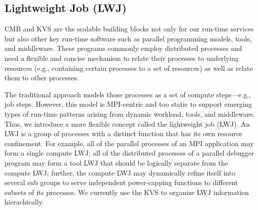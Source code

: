 \subsection{Lightweight Job (LWJ)}
CMB and KVS are the scalable building blocks not only for our run-time services 
but also other key run-time software such as parallel programming models, 
tools, and middleware. These programs commonly employ distributed processes and need a 
flexible and concise mechanism to relate their processes to underlying resources 
(e.g., containing certain processes to a set of resources) as well as relate 
them to other processes. 

The traditional approach models those processes as
a set of compute steps---e.g., job steps. However, this model 
is MPI-centric and too static to support emerging types
of run-time patterns arising from dynamic workload, tools, and middleware.
Thus, we introduce a more flexible concept called the lightweight job (LWJ).
An LWJ is a group
of processes with a distinct function that has its own resource confinement. 
For example, all of the parallel
processes of an MPI application may form a single compute LWJ; all of the distributed processes
of a parallel debugger program may form a tool LWJ that should be logically separate from the
compute LWJ; further, the compute LWJ may dynamically refine itself into several 
sub groups to serve independent power-capping functions to different subsets of its processes.
We currently use the KVS to organize LWJ information hierachically.
